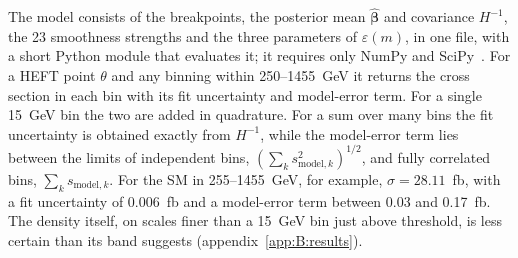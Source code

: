 The model consists of the breakpoints, the posterior mean $\hat{\boldsymbol\beta}$ and covariance $H^{-1}$, the 23
smoothness strengths and the three parameters of $\varepsilon(m)$, in one file, with a short Python module that
evaluates it; it requires only NumPy and SciPy~\cite{dihiggs:github}. For a HEFT point $\theta$ and any binning within
250--1455~GeV it returns the cross section in each bin with its fit uncertainty and model-error term. For a single
15~GeV bin the two are added in quadrature. For a sum over many bins the fit uncertainty is obtained exactly from
$H^{-1}$, while the model-error term lies between the limits of independent bins, $(\sum_k s^2_{\text{model},k})^{1/2}$,
and fully correlated bins, $\sum_k s_{\text{model},k}$. For the SM in 255--1455~GeV, for example,
$\sigma = 28.11$~fb, with a fit uncertainty of 0.006~fb and a model-error term between 0.03 and 0.17~fb. The
density itself, on scales finer than a 15~GeV bin just above threshold, is less certain than its band suggests
(appendix~\ref{app:B:results}).
